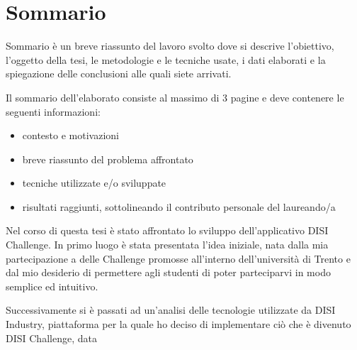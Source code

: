 \chapter*{Sommario} %
\label{sommario}





  Sommario è un breve riassunto del lavoro svolto dove si descrive l'obiettivo, l'oggetto della tesi, le 
metodologie e le tecniche usate, i dati elaborati e la spiegazione delle conclusioni alle quali siete arrivati.  

Il sommario dell’elaborato consiste al massimo di 3 pagine e deve contenere le seguenti informazioni:
\begin{itemize}
  \item contesto e motivazioni 
  \item breve riassunto del problema affrontato
  \item tecniche utilizzate e/o sviluppate
  \item risultati raggiunti, sottolineando il contributo personale del laureando/a
\end{itemize}

Nel corso di questa tesi è stato affrontato lo sviluppo dell'applicativo DISI Challenge. In primo luogo è stata presentata l'idea iniziale, nata dalla mia partecipazione a delle Challenge promosse all'interno dell'università di Trento e dal mio desiderio di permettere agli studenti di poter parteciparvi in modo semplice ed intuitivo. 

Successivamente si è passati ad un'analisi delle tecnologie utilizzate da DISI Industry, piattaforma per la quale ho deciso di implementare ciò che è divenuto DISI Challenge, data 



